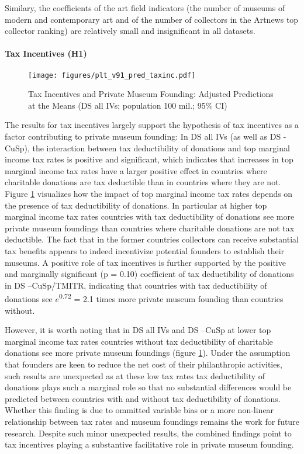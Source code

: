 \documentclass[11pt]{article}
\begin{document}
Similary, the coefficients of the art field indicators (the number of museums of modern and contemporary art and of the number of collectors in the Artnews top collector ranking) are relatively small and insignificant in all datasets.





\paragraph*{Tax Incentives (H1)}




\begin{figure}[htbp]
\centering
\texttt{[image: figures/plt\_v91\_pred\_taxinc.pdf]}
\caption{\label{fig:pred_taxinc}Tax Incentives and Private Museum Founding: Adjusted Predictions at the Means (DS all IVs; population 100 mil.; 95\% CI)}
\end{figure}

The results for tax incentives largely support the hypothesis of tax incentives as a factor contributing to private museum founding:
In DS all IVs (as well as DS -CuSp), the interaction between tax deductibility of donations and top marginal income tax rates is positive and significant, which indicates that increases in top marginal income tax rates have a larger positive effect in countries where charitable donations are tax deductible than in countries where they are not.
Figure \ref{fig:pred_taxinc} visualizes how the impact of top marginal income tax rates depends on the presence of tax deductibility of donations.
In particular at higher top marginal income tax rates countries with tax deductibility of donations see more private museum foundings than countries where charitable donations are not tax deductible.
The fact that in the former countries collectors can receive substantial tax benefits appears to indeed incentivize potential founders to establish their museums.
A positive role of tax incentives is further supported by the positive and marginally significant (p = 0.10) coefficient of tax deductibility of donations in DS --CuSp/TMITR, indicating that countries with tax deductibility of donations see \(e\)\textsuperscript{0.72} = 2.1 times more private museum founding than countries without. 



However, it is worth noting that in DS all IVs and DS --CuSp at lower top marginal income tax rates countries without tax deductibility of charitable donations see more private museum foundings (figure \ref{fig:pred_taxinc}).
Under the assumption that founders are keen to reduce the net cost of their philanthropic activities, such results are unexpected as at these low tax rates tax deductibility of donations plays such a marginal role so that no substantial differences would be predicted between countries with and without tax deductibility of donations.  
Whether this finding is due to ommitted variable bias or a more non-linear relationship between tax rates and museum foundings remains the work for future research.
Despite such minor unexpected results, the combined findings point to tax incentives playing a substantive facilitative role in private museum founding. 
\end{document}
